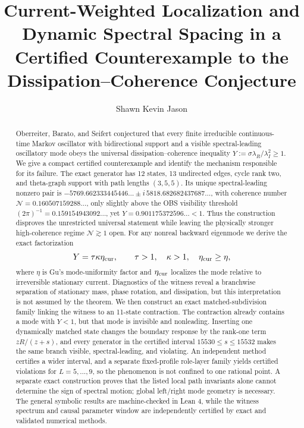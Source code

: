 \documentclass[aps,pre,reprint,groupedaddress,nofootinbib,showkeys,floatfix]{revtex4-2}
\newcommand{\Ncoh}{\mathcal N}
\begin{document}
\title{Current-Weighted Localization and Dynamic Spectral Spacing in a Certified Counterexample to the Dissipation--Coherence Conjecture}
\author{Shawn Kevin Jason}
\date[]{}

\begin{abstract}
Oberreiter, Barato, and Seifert conjectured that every finite irreducible continuous-time Markov oscillator with bidirectional support and a visible spectral-leading oscillatory mode obeys the universal dissipation--coherence inequality $Y:=\sigma\lambda_R/\lambda_I^2\ge 1$. We give a compact certified counterexample and identify the mechanism responsible for its failure. The exact generator has 12 states, 13 undirected edges, cycle rank two, and theta-graph support with path lengths $(3,5,5)$. Its unique spectral-leading nonzero pair is $-5769.662333445446\ldots\pm i\,5818.682682437687\ldots$, with coherence number $\Ncoh=0.160507159288\ldots$, only slightly above the OBS visibility threshold $(2\pi)^{-1}=0.159154943092\ldots$, yet $Y=0.901175372596\ldots<1$. Thus the construction disproves the unrestricted universal statement while leaving the physically stronger high-coherence regime $\Ncoh\gtrsim1$ open. For any nonreal backward eigenmode we derive the exact factorization
\[
Y=\tau\kappa\eta_{\rm cur},\qquad \tau>1,\quad\kappa>1,\quad\eta_{\rm cur}\ge\eta,
\]
where $\eta$ is Gu's mode-uniformity factor and $\eta_{\rm cur}$ localizes the mode relative to irreversible stationary current. Diagnostics of the witness reveal a branchwise separation of stationary mass, phase rotation, and dissipation, but this interpretation is not assumed by the theorem. We then construct an exact matched-subdivision family linking the witness to an 11-state contraction. The contraction already contains a mode with $Y<1$, but that mode is invisible and nonleading. Inserting one dynamically matched state changes the boundary response by the rank-one term $zR/(z+s)$, and every generator in the certified interval $15530\le s\le15532$ makes the same branch visible, spectral-leading, and violating. An independent method certifies a wider interval, and a separate fixed-profile role-layer family yields certified violations for $L=5,\ldots,9$, so the phenomenon is not confined to one rational point. A separate exact construction proves that the listed local path invariants alone cannot determine the sign of spectral motion; global left/right mode geometry is necessary. The general symbolic results are machine-checked in Lean 4, while the witness spectrum and causal parameter window are independently certified by exact and validated numerical methods.
\end{abstract}
\end{document}
